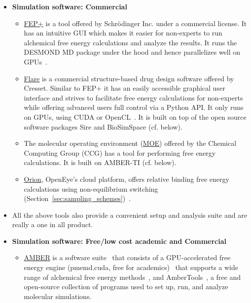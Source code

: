 \documentclass[9pt,bestpractices]{livecoms}
\begin{document}
\begin{itemize}
\item [] \textbf{Simulation software: Commercial}
   \begin{itemize}
    \item \href{https://www.schrodinger.com/fep}{FEP+} is a tool offered by Schr\"{o}dinger Inc. under a commercial license. It has an intuitive GUI which makes it easier for non-experts to run alchemical free energy calculations and analyze the results. It runs the DESMOND MD package under the hood and hence parallelizes well on GPUs~\cite{wang2015accurate}. 
    \item \href{https://www.cresset-group.com/software/flare/}{Flare} is a commercial structure-based drug design software offered by Cresset. Similar to FEP+ it has an easily accessible graphical user interface and strives to facilitate free energy calculations for non-experts while offering advanced users full control via a Python API. It only runs on GPUs, using CUDA or OpenCL~\cite{kuhn2020assessment}. It is built on top of the open source software packages Sire and BioSimSpace (cf. below).
     \item The molecular operating environment (\href{https://www.chemcomp.com/Products.htm}{MOE}) offered by the Chemical Computing Group (CCG) has a tool for performing free energy calculations. It is built on AMBER-TI (cf. below).
    \item \href{https://www.eyesopen.com/orion}{Orion}, OpenEye's cloud platform, offers relative binding free energy calculations using non-equilibrium switching (Section~\ref{sec:sampling_schemes})~\cite{sorensen2024orion}.
    \end{itemize}
    \item[]All the above tools also provide a convenient setup and analysis suite and are really a one in all product. \newline
\item [] \textbf{Simulation software: Free/low cost academic and Commercial}
	\begin{itemize}
    \item \href{https://ambermd.org/}{AMBER} is a software suite~\cite{Case_JChemInfModel_2025_v65_p7835} that consists of a GPU-accelerated free energy engine (pmemd.cuda, free for academics)~\cite{Lee_JChemTheoryComput_2017_v13_p3077,Giese_JChemTheoryComput_2018_v14_p1564,Lee_JChemInfModel_2018_v58_p2043} that supports a wide range of alchemical free energy methods~\cite{tsai2023amber,lee2023aces,zhang_jchemtheorycomput_2024_v20_p3935}, and AmberTools~\cite{case_jcheminfmodel_2023_v63_p6183}, a free and open-source collection of programs used to set up, run, and analyze molecular simulations.

\end{itemize}
\end{itemize}
\end{document}
